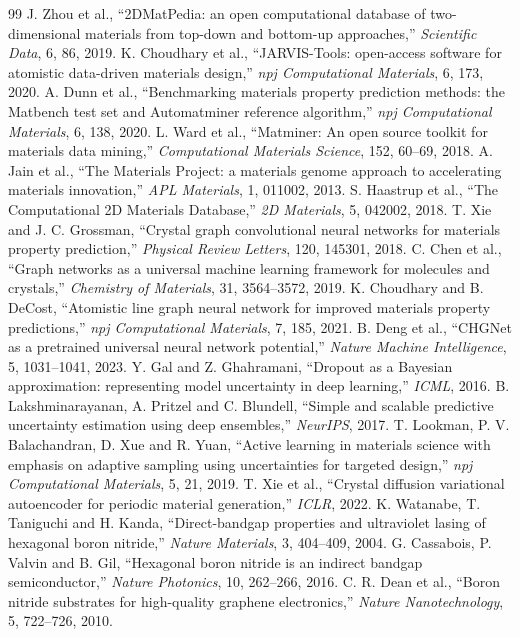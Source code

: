 \documentclass[10pt,a4paper]{article}
\begin{document}
\small
\renewcommand{\refname}{Selected References}
\begin{thebibliography}{99}
\setlength{\itemsep}{-1pt}
 J. Zhou et al., ``2DMatPedia: an open computational database of two-dimensional materials from top-down and bottom-up approaches,'' \textit{Scientific Data}, 6, 86, 2019.
 K. Choudhary et al., ``JARVIS-Tools: open-access software for atomistic data-driven materials design,'' \textit{npj Computational Materials}, 6, 173, 2020.
 A. Dunn et al., ``Benchmarking materials property prediction methods: the Matbench test set and Automatminer reference algorithm,'' \textit{npj Computational Materials}, 6, 138, 2020.
 L. Ward et al., ``Matminer: An open source toolkit for materials data mining,'' \textit{Computational Materials Science}, 152, 60--69, 2018.
 A. Jain et al., ``The Materials Project: a materials genome approach to accelerating materials innovation,'' \textit{APL Materials}, 1, 011002, 2013.
 S. Haastrup et al., ``The Computational 2D Materials Database,'' \textit{2D Materials}, 5, 042002, 2018.
 T. Xie and J. C. Grossman, ``Crystal graph convolutional neural networks for materials property prediction,'' \textit{Physical Review Letters}, 120, 145301, 2018.
 C. Chen et al., ``Graph networks as a universal machine learning framework for molecules and crystals,'' \textit{Chemistry of Materials}, 31, 3564--3572, 2019.
 K. Choudhary and B. DeCost, ``Atomistic line graph neural network for improved materials property predictions,'' \textit{npj Computational Materials}, 7, 185, 2021.
 B. Deng et al., ``CHGNet as a pretrained universal neural network potential,'' \textit{Nature Machine Intelligence}, 5, 1031--1041, 2023.
 Y. Gal and Z. Ghahramani, ``Dropout as a Bayesian approximation: representing model uncertainty in deep learning,'' \textit{ICML}, 2016.
 B. Lakshminarayanan, A. Pritzel and C. Blundell, ``Simple and scalable predictive uncertainty estimation using deep ensembles,'' \textit{NeurIPS}, 2017.
 T. Lookman, P. V. Balachandran, D. Xue and R. Yuan, ``Active learning in materials science with emphasis on adaptive sampling using uncertainties for targeted design,'' \textit{npj Computational Materials}, 5, 21, 2019.
 T. Xie et al., ``Crystal diffusion variational autoencoder for periodic material generation,'' \textit{ICLR}, 2022.
 K. Watanabe, T. Taniguchi and H. Kanda, ``Direct-bandgap properties and ultraviolet lasing of hexagonal boron nitride,'' \textit{Nature Materials}, 3, 404--409, 2004.
 G. Cassabois, P. Valvin and B. Gil, ``Hexagonal boron nitride is an indirect bandgap semiconductor,'' \textit{Nature Photonics}, 10, 262--266, 2016.
 C. R. Dean et al., ``Boron nitride substrates for high-quality graphene electronics,'' \textit{Nature Nanotechnology}, 5, 722--726, 2010.
\end{thebibliography}
\normalsize
\end{document}
